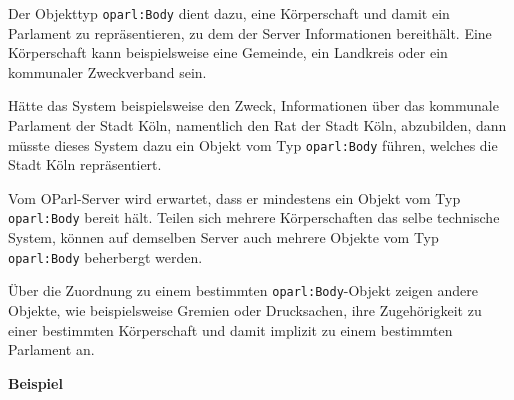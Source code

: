 \documentclass[,a4paper]{article}
\begin{document}

Der Objekttyp \texttt{oparl:Body} dient dazu, eine Körperschaft und
damit ein Parlament zu repräsentieren, zu dem der Server Informationen
bereithält. Eine Körperschaft kann beispielsweise eine Gemeinde, ein
Landkreis oder ein kommunaler Zweckverband sein.

Hätte das System beispielsweise den Zweck, Informationen über das
kommunale Parlament der Stadt Köln, namentlich den Rat der Stadt Köln,
abzubilden, dann müsste dieses System dazu ein Objekt vom Typ
\texttt{oparl:Body} führen, welches die Stadt Köln repräsentiert.

Vom OParl-Server wird erwartet, dass er mindestens ein Objekt vom Typ
\texttt{oparl:Body} bereit hält. Teilen sich mehrere Körperschaften das
selbe technische System, können auf demselben Server auch mehrere
Objekte vom Typ \texttt{oparl:Body} beherbergt werden.

Über die Zuordnung zu einem bestimmten \texttt{oparl:Body}-Objekt zeigen
andere Objekte, wie beispielsweise Gremien oder Drucksachen, ihre
Zugehörigkeit zu einer bestimmten Körperschaft und damit implizit zu
einem bestimmten Parlament an.

\textbf{Beispiel}
\end{document}
